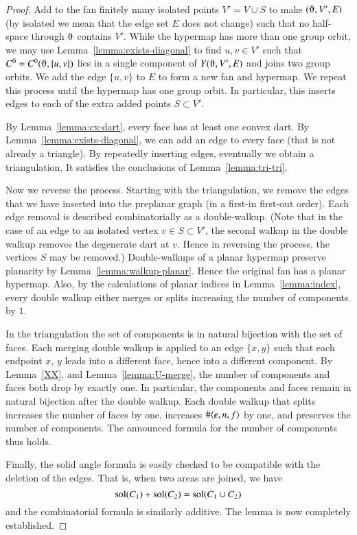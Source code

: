 \begin{proof}  
Add to the fan finitely many isolated
points  $V' = V\cup S$ to make $(\orgn,V',E)$ (by isolated we mean that the edge set $E$ does not change) such that no half-space
through $\orgn$ contains $V'$.    While the hypermap
has more than one group orbit, 
we may use Lemma~\ref{lemma:exists-diagonal} to find $u,v\in V'$ such
that $C^0=C^0(\orgn,\{u,v\})$ lies in a single component of $Y(\orgn,V',E)$ and
joins two group orbits.  We add the edge $\{u,v\}$ to $E$ to form
a new fan and hypermap.
We repeat this process until the hypermap has one group orbit.  In particular, this
inserts edges to each of the extra added points $S\subset V'$.


By Lemma~\ref{lemma:cx-dart},
every face has at least one convex dart.  By Lemma~\ref{lemma:exists-diagonal},
we can add an edge to every face (that is not already a triangle).  By repeatedly
inserting edges, eventually we obtain a triangulation.  It satisfies
the conclusions of Lemma~\ref{lemma:tri-tri}.

Now we reverse the process.  Starting with the triangulation, we remove the
edges that we have inserted into the preplanar graph  (in a first-in first-out order).  
Each edge removal is
described combinatorially as a double-walkup.  (Note that
in the case of an edge to an isolated vertex  $v\in S\subset V'$, the second walkup
in the double walkup
 removes the degenerate dart at $v$.  Hence in reversing the process,
the vertices $S$ may be removed.)  Double-walkups of
a planar hypermap preserve planarity by Lemma~\ref{lemma:walkup-planar}.  Hence the original
fan has a planar hypermap.  Also, by the calculations of planar indices
in Lemma~\ref{lemma:index}, every double walkup either merges or  splits
 increasing the number of components by $1$.

In the triangulation the set of components is in natural bijection with the set of faces.
Each merging double walkup is applied to an edge $\{x,y\}$ such that each endpoint $x$,
$y$ leads into a different face, hence into a different component.  By Lemma~\ref{XX},
and Lemma~\ref{lemma:U-merge}, the number of components and faces both drop by exactly one.
In particular, the components and faces remain in natural bijection after the
double walkup.  Each double walkup that splits increases the number of faces by one,
increases $\#\langle e,n,f\rangle$ by one, and preserves the number of components.
The announced formula for the number of components thus holds.

Finally, the solid angle formula is easily checked to be compatible with
the deletion of the edges.  That is, when two areas are joined, we have
  $${\operatorname{sol}}(C_1) + {\operatorname{sol}}(C_2) = {\operatorname{sol}}(C_1\cup C_2)$$
and the combinatorial formula is similarly additive.
The lemma is now completely established.
\end{proof}



